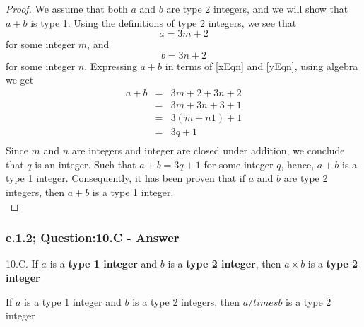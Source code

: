 \begin{proof}
We assume that both $a$ and $b$ are type 2 integers, and we will show that $a + b$ is type 1. Using the definitions of type 2 integers, we see that
\begin{equation}
\label{xEqn}
a = 3m + 2
\end{equation}
for some integer $m$, and
\begin{equation}
\label{yEqn}
b = 3n + 2
\end{equation}
for some integer $n$. Expressing $a + b$ in terms of \ref{xEqn} and \ref{yEqn}, using algebra we get
\begin{eqnarray*}
a + b & = & 3m + 2 + 3n + 2  \nonumber \\
& = & 3m + 3n + 3 + 1 \nonumber \\
& = & 3(m + n 1) + 1 \nonumber \\
& = & 3q + 1 \nonumber \\
\end{eqnarray*}
Since $m$ and $n$ are integers and integer are closed under addition, we conclude that $q$ is an integer. Such that $a + b = 3q + 1$ for some integer $q$, hence, $a + b$ is a type 1 integer. Consequently, it has been proven that if $a$ and $b$ are type 2 integers, then $a + b$ is a type 1 integer. \\
\end{proof}



\subsubsection*{e.1.2; Question:10.C - Answer}
10.C. If $a$ is a {\bf type 1 integer} and $b$ is a {\bf type 2 integer}, then $a \times b$ is a {\bf type 2 integer} \\

\begin{tcolorbox}
\begin{theorem}
If $a$ is a type 1 integer and $b$ is a type 2 integers, then $a /times b$ is a type 2 integer
\end{theorem}
\end{tcolorbox}

